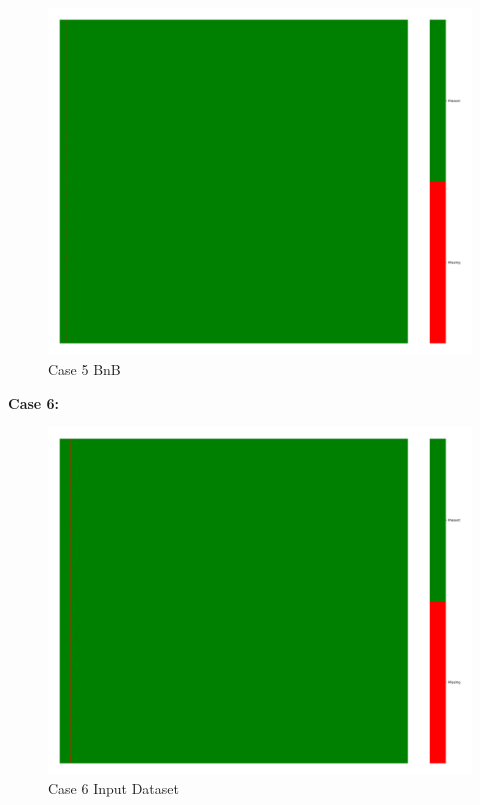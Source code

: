 \documentclass[a4paper,12pt]{article}
\begin{document}
\begin{figure}[H]
    \includegraphics[width=\linewidth]{case5_bnb_heatmap_cleaned.png}
    \caption*{Case 5 BnB}
\end{figure}

\textbf{Case 6:}
\begin{figure}[H]
    \centering
    \includegraphics[width=\linewidth]{case6_heatmap_erased.png}
    \caption*{Case 6 Input Dataset}
\end{figure}
\end{document}
